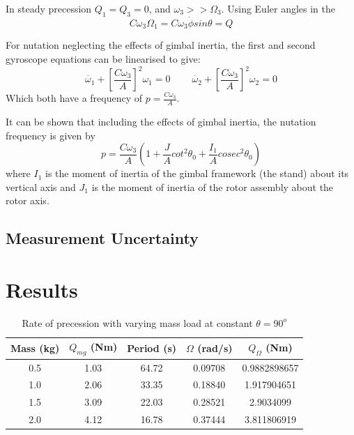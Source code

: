 \documentclass[8pt]{article}
\begin{document}
In steady precession $Q_1 = Q_3 = 0$, and $\omega_3 >> \Omega_3$.
Using Euler angles in the 
\begin{equation}
    C\omega_3 \Omega_1 = C\omega_3 \dot{\phi} sin \theta = Q
\end{equation}

For nutation neglecting the effects of gimbal inertia, the first and second gyroscope equations can be linearised to give:
\begin{equation}
    \ddot{\omega_1} + \left[ \frac{C\omega_3}{A} \right]^2 \omega_1 = 0 \;\;\;\;\;\;\;\; \ddot{\omega_2} + \left[ \frac{C\omega_3}{A} \right]^2 \omega_2 = 0
\end{equation}
Which both have a frequency of $ p = \frac{C\omega_3}{A} $.

It can be shown that including the effects of gimbal inertia, the nutation frequency is given by
\begin{equation}
    p = \frac{C\omega_3}{A} \left( 1 + \frac{J}{A}cot^2\theta_0 + \frac{I_1}{A}cosec^2\theta_0 \right)
\end{equation}
where $I_1$ is the moment of inertia of the gimbal framework (the stand) about its vertical axis
and $J_1$ is the moment of inertia of the rotor assembly about the rotor axis.

\subsection{Measurement Uncertainty}


\section{Results}

\begin{table}[H]
    \centering
    \begin{tabular}{|c|c|c|c|c|}
        \hline
        Mass (kg) & $Q_{mg}$ (Nm) & Period (s) & $\Omega$ (rad/s) & $Q_{\Omega} $ (Nm) \\
        \hline
        0.5 & 1.03 & 64.72 & 0.09708 & 0.9882898657\\
        1.0 & 2.06 & 33.35 & 0.18840 & 1.917904651\\
        1.5 & 3.09 & 22.03 & 0.28521 & 2.9034099\\
        2.0 & 4.12 & 16.78 & 0.37444 & 3.811806919\\
        \hline
    \end{tabular}
    \caption{Rate of precession with varying mass load at constant $\theta = 90^o$}
\end{table}
\end{document}
